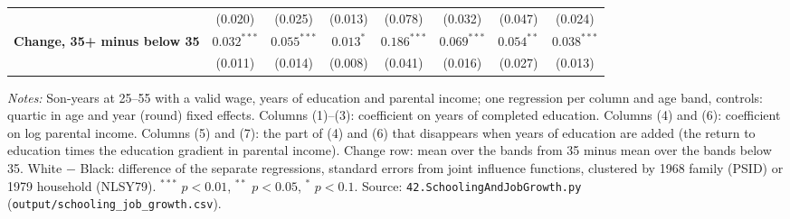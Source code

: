 \begin{table}[!htbp]
{{\begin{tabular}{lccccccc}
 & (0.020) & (0.025) & (0.013) & (0.078) & (0.032) & (0.047) & (0.024) \\
\textbf{Change, 35+ minus below 35} & $0.032^{***}$ & $0.055^{***}$ & $0.013^{*}$ & $0.186^{***}$ & $0.069^{***}$ & $0.054^{**}$ & $0.038^{***}$ \\
 & (0.011) & (0.014) & (0.008) & (0.041) & (0.016) & (0.027) & (0.013) \\
\bottomrule
\end{tabular}}}
\par\smallskip
\begin{minipage}{\textwidth}\footnotesize \textit{Notes:} Son-years at 25--55 with a valid wage, years of education and parental income; one regression per column and age band, controls: quartic in age and year (round) fixed effects. Columns (1)--(3): coefficient on years of completed education. Columns (4) and (6): coefficient on log parental income. Columns (5) and (7): the part of (4) and (6) that disappears when years of education are added (the return to education times the education gradient in parental income). Change row: mean over the bands from 35 minus mean over the bands below 35. White $-$ Black: difference of the separate regressions, standard errors from joint influence functions, clustered by 1968 family (PSID) or 1979 household (NLSY79). $^{***}$ $p<0.01$, $^{**}$ $p<0.05$, $^{*}$ $p<0.1$. Source: \texttt{42.SchoolingAndJobGrowth.py} (\texttt{output/schooling\_job\_growth.csv}).\end{minipage}
\end{table}
